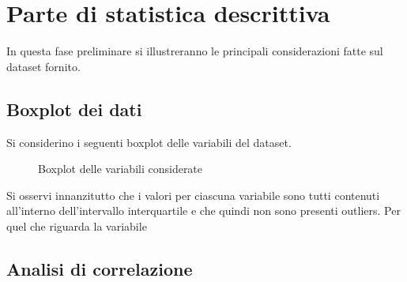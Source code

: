 \section{Parte di statistica descrittiva}
In questa fase preliminare si illustreranno le principali considerazioni fatte sul dataset fornito.
\subsection{Boxplot dei dati}
Si considerino i seguenti boxplot delle variabili del dataset.
\begin{figure}[h]
	\centering
	\hfill
	\caption{Boxplot delle variabili considerate}
\end{figure}

Si osservi innanzitutto che i valori per ciascuna variabile sono tutti contenuti all'interno dell'intervallo interquartile e che quindi non sono presenti outliers. Per quel che riguarda la variabile 


\subsection{Analisi di correlazione}
